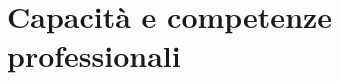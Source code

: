 \documentclass[11pt,a4paper,sans]{moderncv}
\begin{document}

\section{Capacità e competenze professionali}



\cvskilllegend*[1em]{}%

\end{document}
